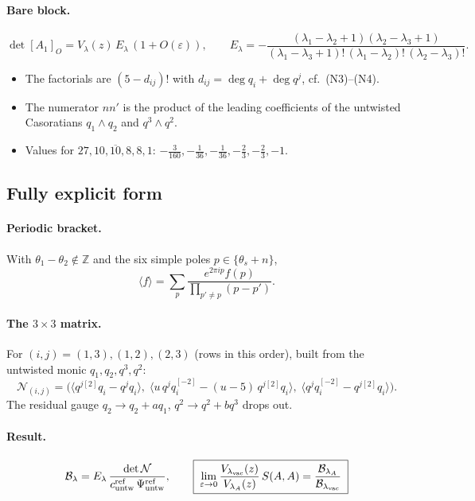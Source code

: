 \documentclass[11pt]{article}
\newcommand{\eps}{\varepsilon}
\newcommand{\vac}{{\rm vac}}
\newcommand{\untw}{{\rm untw}}
\begin{document}
\paragraph{Bare block.}
\begin{equation}
\det[A_1]_O=V_\lambda(z)\,E_\lambda\,(1+O(\eps)),\qquad
E_\lambda=-\frac{(\lambda_1-\lambda_2+1)(\lambda_2-\lambda_3+1)}{(\lambda_1-\lambda_3+1)!\,(\lambda_1-\lambda_2)!\,(\lambda_2-\lambda_3)!}.
\end{equation}
\begin{itemize}
\item The factorials are $(5-d_{ij})!$ with $d_{ij}=\deg q_i+\deg q^j$, cf.\ (N3)--(N4).
\item The numerator $nn'$ is the product of the leading coefficients of the untwisted Casoratians $q_1\wedge q_2$ and $q^3\wedge q^2$.
\item Values for $27,10,\overline{10},8,8,1$: $-\tfrac3{160},-\tfrac1{36},-\tfrac1{36},-\tfrac23,-\tfrac23,-1$.
\end{itemize}

\subsection*{Fully explicit form}

\paragraph{Periodic bracket.} With $\theta_1-\theta_2\notin\mathbb Z$ and the six simple poles $p\in\{\theta_s+n\}$,
\begin{equation}
\langle f\rangle=\sum_p\frac{e^{2\pi ip}f(p)}{\prod_{p'\neq p}(p-p')}.
\end{equation}

\paragraph{The $3\times3$ matrix.} For $(i,j)=(1,3),(1,2),(2,3)$ (rows in this order), built from the untwisted monic $q_1,q_2,q^3,q^2$:
\begin{equation}
\mathcal N_{(i,j)}=\Big(\big\langle q^{j[2]}q_i-q^jq_i\big\rangle,\;
\big\langle u\,q^jq_i^{[-2]}-(u-5)\,q^{j[2]}q_i\big\rangle,\;
\big\langle q^jq_i^{[-2]}-q^{j[2]}q_i\big\rangle\Big).
\end{equation}
The residual gauge $q_2\to q_2+aq_1$, $q^2\to q^2+bq^3$ drops out.

\paragraph{Result.}
\begin{equation}
\mathcal B_\lambda=E_\lambda\,\frac{\det\mathcal N}{c^{\rm ref}_\untw\,\Psi^{\rm ref}_\untw},\qquad
\boxed{\;\lim_{\eps\to0}\frac{V_{\lambda_\vac}(z)}{V_{\lambda_A}(z)}\,S(A,A)=\frac{\mathcal B_{\lambda_A}}{\mathcal B_{\lambda_\vac}}\;}
\end{equation}
\end{document}
